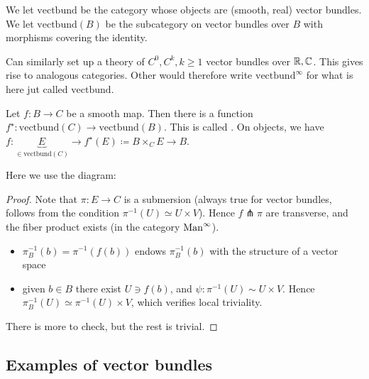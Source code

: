 \begin{definition*}
    We let \(\text{vectbund}\) be the category whose objects are (smooth, real) vector bundles. We 
    let \(\text{vectbund}(B)\) be the subcategory on vector bundles over \(B\) with morphisms covering the 
    identity.
\end{definition*}

\begin{remark}
    Can similarly set up a theory of \(C^0,C^k,k\geq 1\) vector bundles over \(\mathbb{R},\mathbb{C}\). This gives rise to 
    analogous categories. Other would therefore write \(\text{vectbund}^\infty\) for what is here jut called \(\text{vectbund}\). 
\end{remark}

\begin{lemma}[Construction]\label{lem:8.2}
    Let \(f:B\to C\) be a smooth map. Then there is a function \(f^\star:\text{vectbund}(C)\to \text{vectbund}(B)\).
    This is called . On objects, we have \(f:\underbrace{E}_{\in \text{vectbund}(C)}\to f^\star(E)\coloneqq B\times_C E \to B\).
\end{lemma}
 Here we use the diagram: 
\begin{center}
\end{center}

\begin{proof}
    Note that \(\pi:E\to C\) is a submersion (always true for vector bundles, follows from the condition \(\pi^{-1}(U)\simeq U\times V\)).
    Hence \(f \pitchfork\pi\)
    are transverse, and the fiber product exists (in the category \(\text{Man}^\infty\)).
    \begin{itemize}
        \item \(\pi_B^{-1}(b)=\pi^{-1}(f(b))\) endows \(\pi_B^{-1}(b)\) with the structure of a vector space
        \item given \(b\in B\) there exist \(U\ni f(b)\), and \(\psi:\pi^{-1}(U)\sim U\times V\). Hence \(\pi_B^{-1}(U)\simeq \pi^{-1}(U)\times V\), which verifies local triviality.
    \end{itemize}

    There is more to check, but the rest is trivial.
\end{proof}

\subsection{Examples of vector bundles}


